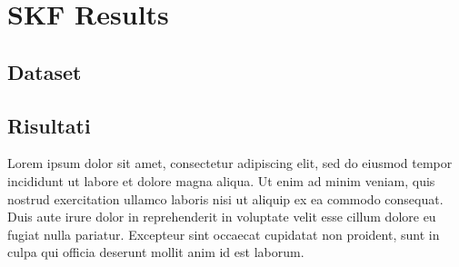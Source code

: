\section{SKF Results}

\subsection{Dataset}
\subsection{Risultati}
Lorem ipsum dolor sit amet, consectetur adipiscing elit, sed do eiusmod tempor incididunt ut labore et dolore magna aliqua. Ut enim ad minim veniam, quis nostrud exercitation ullamco laboris nisi ut aliquip ex ea commodo consequat. Duis aute irure dolor in reprehenderit in voluptate velit esse cillum dolore eu fugiat nulla pariatur. Excepteur sint occaecat cupidatat non proident, sunt in culpa qui officia deserunt mollit anim id est laborum.


